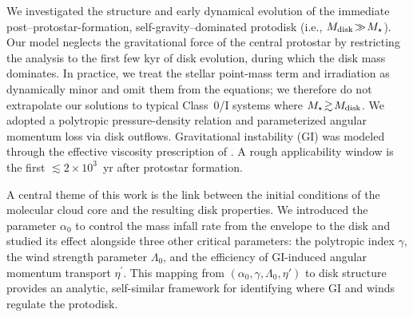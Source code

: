 \documentclass[twocolumn,linenumbers]{aastex631}
\begin{document}

We investigated the structure and early dynamical evolution of the immediate post--protostar-formation, self-gravity--dominated protodisk (i.e., $M_{\rm disk}\!\gg\!M_\star$). Our model neglects the gravitational force of the central protostar by restricting the analysis to the first few kyr of disk evolution, during which the disk mass dominates. In practice, we treat the stellar point-mass term and irradiation as dynamically minor and omit them from the equations; we therefore do not extrapolate our solutions to typical Class~0/I systems where $M_\star\!\gtrsim\!M_{\rm disk}$. We adopted a polytropic pressure-density relation and parameterized angular momentum loss via disk outflows. Gravitational instability (GI) was modeled through the effective viscosity prescription of \citet{lin1987grav}. A rough applicability window is the first $\lesssim 2\times10^{3}$~yr after protostar formation.

A central theme of this work is the link between the initial conditions of the molecular cloud core and the resulting disk properties. We introduced the parameter $\alpha_0$ to control the mass infall rate from the envelope to the disk and studied its effect alongside three other critical parameters: the polytropic index $\gamma$, the wind strength parameter $\Lambda_0$, and the efficiency of GI-induced angular momentum transport $\eta^{\prime}$. This mapping from $(\alpha_0,\gamma,\Lambda_0,\eta')$ to disk structure provides an analytic, self-similar framework for identifying where GI and winds regulate the protodisk.

\end{document}
